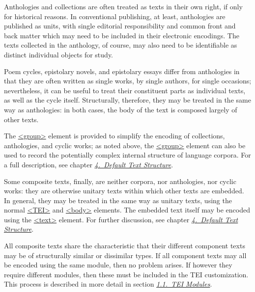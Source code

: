Anthologies and collections are often treated as texts in their own right, if only for historical reasons. In conventional publishing, at least, anthologies are published as units, with single editorial responsibility and common front and back matter which may need to be included in their electronic encodings. The texts collected in the anthology, of course, may also need to be identifiable as distinct individual objects for study. \par
Poem cycles, epistolary novels, and epistolary essays differ from anthologies in that they are often written as single works, by single authors, for single occasions; nevertheless, it can be useful to treat their constituent parts as individual texts, as well as the cycle itself. Structurally, therefore, they may be treated in the same way as anthologies: in both cases, the body of the text is composed largely of other texts. \par
The \hyperref[TEI.group]{<group>} element is provided to simplify the encoding of collections, anthologies, and cyclic works; as noted above, the \hyperref[TEI.group]{<group>} element can also be used to record the potentially complex internal structure of language corpora. For a full description, see chapter \textit{\hyperref[DS]{4.\ Default Text Structure}}.\par
Some composite texts, finally, are neither corpora, nor anthologies, nor cyclic works: they are otherwise unitary texts within which other texts are embedded. In general, they may be treated in the same way as unitary texts, using the normal \hyperref[TEI.TEI]{<TEI>} and \hyperref[TEI.body]{<body>} elements. The embedded text itself may be encoded using the \hyperref[TEI.text]{<text>} element. For further discussion, see chapter \textit{\hyperref[DS]{4.\ Default Text Structure}}.\par
All composite texts share the characteristic that their different component texts may be of structurally similar or dissimilar types. If all component texts may all be encoded using the same module, then no problem arises. If however they require different modules, then these must be included in the TEI customization. This process is described in more detail in section \textit{\hyperref[STMA]{1.1.\ TEI Modules}}.
